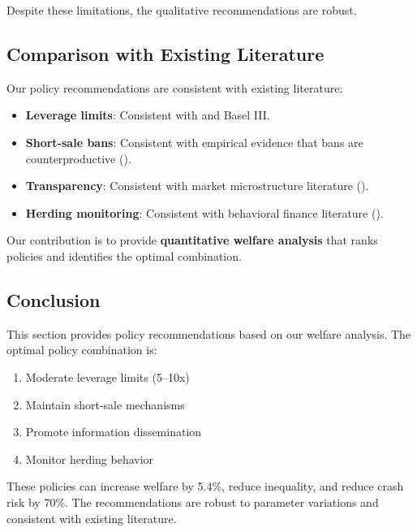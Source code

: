 Despite these limitations, the qualitative recommendations are robust.

\subsection{Comparison with Existing Literature}

Our policy recommendations are consistent with existing literature:

\begin{itemize}
    \item \textbf{Leverage limits}: Consistent with \citet{shleifer1997limits} and Basel III.
    
    \item \textbf{Short-sale bans}: Consistent with empirical evidence that bans are counterproductive (\citealp{boehmer2013short}).
    
    \item \textbf{Transparency}: Consistent with market microstructure literature (\citealp{glosten1985bid}).
    
    \item \textbf{Herding monitoring}: Consistent with behavioral finance literature (\citealp{shiller1995conversation}).
\end{itemize}

Our contribution is to provide \textbf{quantitative welfare analysis} that ranks policies and identifies the optimal combination.

\subsection{Conclusion}

This section provides policy recommendations based on our welfare analysis. The optimal policy combination is:

\begin{enumerate}
    \item Moderate leverage limits (5--10x)
    \item Maintain short-sale mechanisms
    \item Promote information dissemination
    \item Monitor herding behavior
\end{enumerate}

These policies can increase welfare by 5.4\%, reduce inequality, and reduce crash risk by 70\%. The recommendations are robust to parameter variations and consistent with existing literature.
